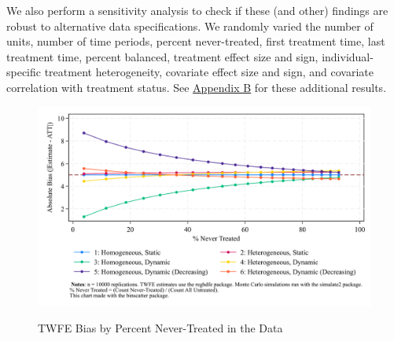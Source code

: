 \documentclass[12pt]{article}
\begin{document}
We also perform a sensitivity analysis to check if these (and other) findings are robust to alternative data specifications. We randomly varied the number of units, number of time periods, percent never-treated, first treatment time, last treatment time, percent balanced, treatment effect size and sign, individual-specific treatment heterogeneity, covariate effect size and sign, and covariate correlation with treatment status. See \hyperref[sec:appendixb]{Appendix B} for these additional results.
\begin{figure}[H]
    \centering
    \caption{TWFE Bias by Percent Never-Treated in the Data}
    \includegraphics[width=6in]{Figures/TWFE Bias by Percent Never Treated.png}
    \label{fig:pc-nevertreat}
\end{figure}
\end{document}
